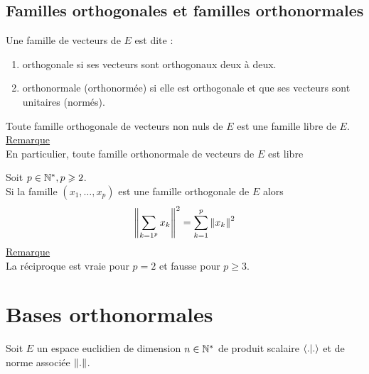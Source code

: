 \subsection{Familles orthogonales et familles orthonormales}
\begin{defi}
    Une famille de vecteurs de \(E\) est dite :
    \begin{enumerate}
        \item orthogonale si ses vecteurs sont orthogonaux deux à deux.
        \item orthonormale (orthonormée) si elle est orthogonale et que ses vecteurs sont unitaires (normés).
    \end{enumerate}
\end{defi}
\begin{defprop}
    Toute famille orthogonale de vecteurs non nuls de \(E\) est une famille libre de \(E\).
    \underline{Remarque}\\
    En particulier, toute famille orthonormale de vecteurs de \(E\) est libre
\end{defprop}
\begin{theo}
    Soit \(p \in \mathbb{N}^*, p \geqslant 2\).\\
    Si la famille \((x_1, \dots , x_p)\) est une famille orthogonale de \(E\) alors
    \[\left\|\sum_{k=1^p} x_k\right\|^2 = \sum_{k=1}^p\left\|x_k\right\|^2\]
    \underline{Remarque}\\
    La réciproque est vraie pour \(p = 2\) et fausse pour \(p \geq 3\).
\end{theo}
\section{Bases orthonormales}
    Soit \(E\) un espace euclidien de dimension \(n \in \mathbb{N}^*\) de produit scalaire \(\langle . | . \rangle\) et de norme associée \(\left\|.\right\|\).

